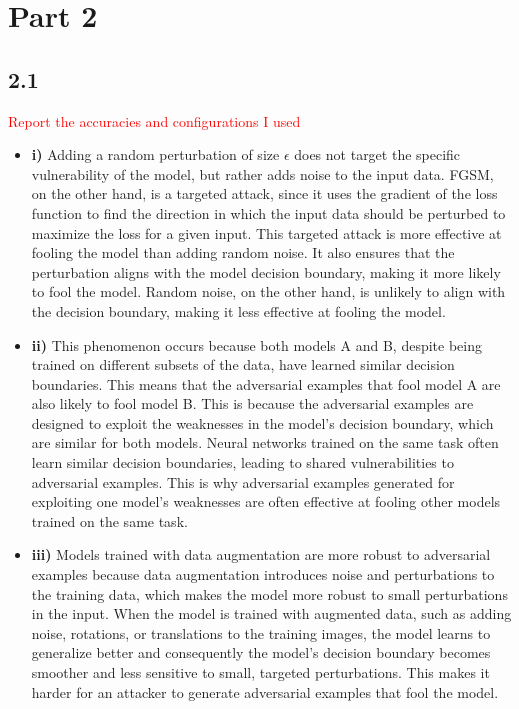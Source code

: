\documentclass{article}
\begin{document}
\newpage
\section*{Part 2}

\subsection*{2.1}

\textcolor{red}{Report the accuracies and configurations I used}

\begin{itemize}
    \item \textbf{i)} Adding a random perturbation of size $\epsilon$ does not target the specific vulnerability of the model,
    but rather adds noise to the input data. FGSM, on the other hand, is a targeted attack, since it uses the gradient of the
    loss function to find the direction in which the input data should be perturbed to maximize the loss for a given input. 
    This targeted attack is more effective at fooling the model than adding random noise. It also ensures that the perturbation
    aligns with the model decision boundary, making it more likely to fool the model. Random noise, on the other hand, is unlikely
    to align with the decision boundary, making it less effective at fooling the model.

    \item \textbf{ii)} This phenomenon occurs because both models A and B, despite being trained on different subsets of the
    data, have learned similar decision boundaries. This means that the adversarial examples that fool model A are also likely
    to fool model B. This is because the adversarial examples are designed to exploit the weaknesses in the model's decision
    boundary, which are similar for both models. Neural networks trained on the same task often learn similar decision boundaries,
    leading to shared vulnerabilities to adversarial examples. This is why adversarial examples generated for exploiting one
    model's weaknesses are often effective at fooling other models trained on the same task.

    \item \textbf{iii)} Models trained with data augmentation are more robust to adversarial examples because data augmentation
    introduces noise and perturbations to the training data, which makes the model more robust to small perturbations in the input.
    When the model is trained with augmented data, such as adding noise, rotations, or translations to the training images,
    the model learns to generalize better and consequently the model's decision boundary becomes smoother and less sensitive
    to small, targeted perturbations. This makes it harder for an attacker to generate adversarial examples that fool the model.
\end{itemize}
\end{document}
